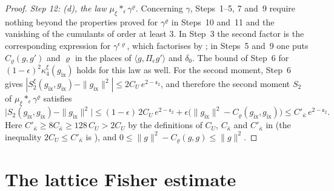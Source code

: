 \documentclass[11pt,letterpaper,reqno]{amsart}
\theoremstyle{definition}
\begin{document}
\begin{proof}
\emph{Step 12: (d), the law $\mu_\xi\ast_\epsilon\gamma^\varrho$.}
Concerning $\gamma$, Steps~1--5, 7 and~9 require nothing beyond the properties proved for $\gamma^\varrho$ in Steps~10 and~11 and the vanishing of the cumulants of order at least $3$.
In Step~3 the second factor is the corresponding expression for $\gamma^{\epsilon\varrho}$, which factorises by \cite[Lemma~9.11\,(c)]{QEDI}; in Steps~5 and~9 one puts $C_\varrho(g,g')$ and $\varrho$ in the places of $\langle g,\Pi_{\mathrm c}g'\rangle$ and $\delta_0$.
The bound of Step~6 for $(1-\epsilon)^2\kappa_4^\xi(g_{\mathrm{ix}})$ holds for this law as well.
For the second moment, Step~6 gives $|S_2^\xi(g_{\mathrm{ix}},\allowbreak g_{\mathrm{ix}})-\|g_{\mathrm{ix}}\|^2|\le2C_U\,\allowbreak e^{2-\mathfrak e_2}$, and therefore the second moment $S_2$ of $\mu_\xi\ast_\epsilon\gamma^\varrho$ satisfies
\begin{equation*}
\bigl|S_2(g_{\mathrm{ix}},g_{\mathrm{ix}})-\|g_{\mathrm{ix}}\|^2\bigr|\le(1-\epsilon)\,2C_U\,e^{2-\mathfrak e_2}+\epsilon\bigl(\|g_{\mathrm{ix}}\|^2-C_\varrho(g_{\mathrm{ix}},g_{\mathrm{ix}})\bigr)\le C'_{\bar\kappa}\,e^{2-\mathfrak e_2}.
\end{equation*}
Here $C'_{\bar\kappa}\ge8C_{\bar\kappa}\ge128\,C_U>2C_U$ by the definitions of $C_U$, $C_{\bar\kappa}$ and $C'_{\bar\kappa}$ in \cite[Proposition~43.2, Constants]{QEDIII} (the inequality $2C_U\le C'_{\bar\kappa}$ is \cite[Chapter~44, (0.2)]{QEDIII}), and $0\le\|g\|^2-C_\varrho(g,g)\le\|g\|^2$.
\end{proof}


\section{The lattice Fisher estimate}
\end{document}
